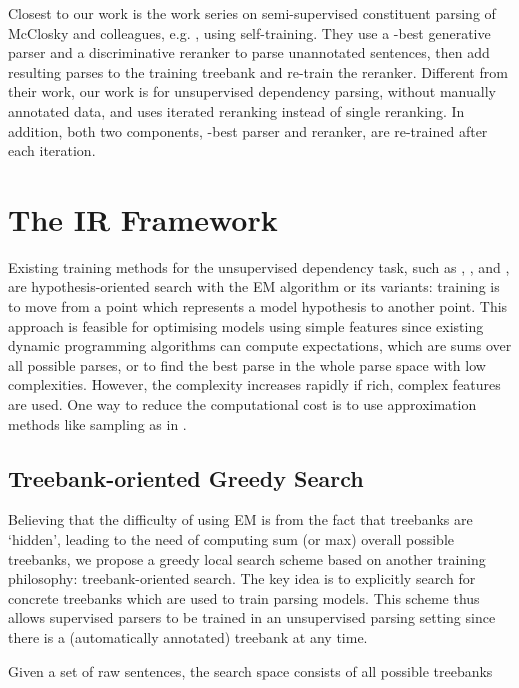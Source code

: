 \documentclass[11pt,letterpaper]{article}
\begin{document}
Closest to our work is the work series on semi-supervised constituent 
parsing of McClosky and colleagues, e.g. , 
using self-training.
They use a -best generative parser and a discriminative reranker 
to parse unannotated sentences, then add resulting parses to 
the training treebank and re-train the reranker. 
Different from their work, our work is for unsupervised dependency 
parsing, without manually annotated data, and uses iterated reranking
instead of single reranking. In addition, both two components, -best
parser and reranker, are re-trained after each iteration. 


\section{The IR Framework}
\label{section MPIR}

Existing training methods for the unsupervised dependency 
task, such as ,
, and ,
are hypothesis-oriented search with the EM algorithm 
or its variants: training is to move 
from a point which represents a model hypothesis to another point.
This approach is feasible for optimising models 
using simple features since existing dynamic programming 
algorithms can compute expectations, 
which are sums over all possible parses, 
or to find the best parse in the whole parse space with low complexities. 
However, the complexity increases rapidly if rich, complex 
features are used. 
One way to reduce the computational cost is to use approximation 
methods like sampling as in . 

\subsection{Treebank-oriented Greedy Search}

Believing that the difficulty of using EM is from the fact that 
treebanks are `hidden', leading to the need of computing sum (or max) overall 
possible treebanks,  
we propose a greedy local search scheme based on another  
training philosophy: treebank-oriented search.
The key idea is to explicitly search for concrete treebanks which 
are used to train parsing models. 
This scheme thus allows supervised parsers to
be trained in an unsupervised parsing setting 
since there is a (automatically annotated) 
treebank at any time. 

Given  a set of raw sentences, the search 
space consists of all possible treebanks
 
\end{document}
